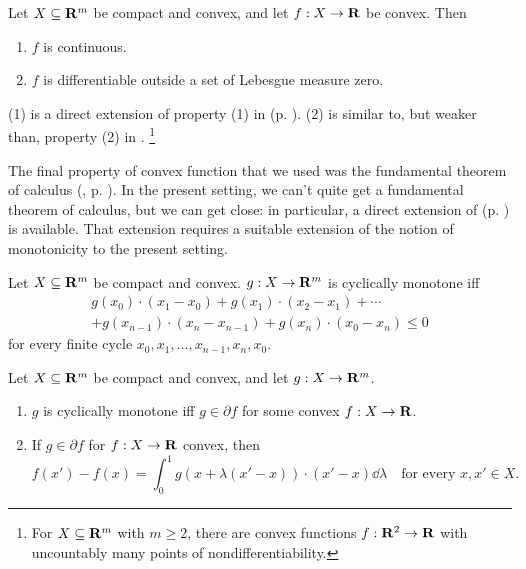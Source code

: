 \documentclass[11pt,letterpaper,reqno,oneside]{article}
\begin{document}
\begin{proposition}
	Let $X \subseteq \mathbf{R}^m$ be compact and convex, and let $f : X \to \mathbf{R}$ be convex. Then
	\begin{enumerate}

		\item $f$ is continuous.

		\item $f$ is differentiable outside a set of Lebesgue measure zero.

	\end{enumerate}
\end{proposition}
%
\noindent (1) is a direct extension of property (1) in  (p. \pageref{proposition:convex_properties_1d}). (2) is similar to, but weaker than, property (2) in .%
	\footnote{For $X \subseteq \mathbf{R}^m$ with $m\geq 2$, there are convex functions $f : \mathbf{R}^2 \to \mathbf{R}$ with uncountably many points of nondifferentiability.}


The final property of convex function that we used was the fundamental theorem of calculus (, p. \pageref{theorem:convex_FTC_1d}). In the present setting, we can't quite get a fundamental theorem of calculus, but we can get close: in particular, a direct extension of  (p. \pageref{corollary:convex_FTC_1d}) is available. That extension requires a suitable extension of the notion of monotonicity to the present setting.
%
\begin{definition}
	Let $X \subseteq \mathbf{R}^m$ be compact and convex. $g : X \to \mathbf{R}^m$ is cyclically monotone iff
	\begin{multline*}
		g(x_0) \cdot ( x_1 - x_0 ) + g(x_1) \cdot ( x_2 - x_1 ) + \cdots 
		\\
		+ g(x_{n-1}) \cdot ( x_n - x_{n-1} ) + g(x_n) \cdot ( x_0 - x_n ) \leq 0 
	\end{multline*}
	for every finite cycle $x_0,x_1,\dots,x_{n-1},x_n,x_0$.
\end{definition}

\begin{theorem}
	\label{theorem:convex_FTC}
	Let $X \subseteq \mathbf{R}^m$ be compact and convex, and let $g : X \to \mathbf{R}^m$.
	\begin{enumerate}

		\item $g$ is cyclically monotone iff $g \in \partial f$ for some convex $f : X \to \mathbf{R}$.

		\item If $g \in \partial f$ for $f : X \to \mathbf{R}$ convex, then
		\begin{equation*}
			f(x') - f(x) = \int_0^1 g( x + \lambda(x'-x) ) \cdot (x'-x) \dd \lambda 
			\quad\text{for every $x,x' \in X$} .
		\end{equation*}

	\end{enumerate}
\end{theorem}
\end{document}

